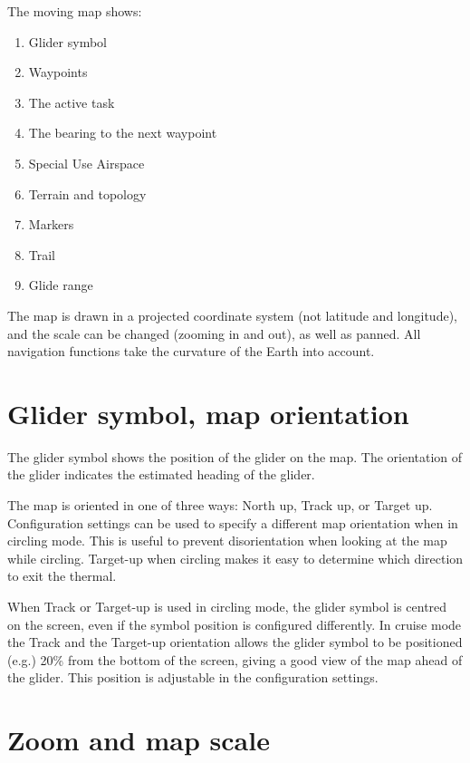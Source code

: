\documentclass[a4paper,12pt]{refrep}
\begin{document}
The moving map shows:
\begin{enumerate} 
\item Glider symbol
\item Waypoints
\item The active task
\item The bearing to the next waypoint
\item Special Use Airspace
\item Terrain and topology
\item Markers
\item Trail
\item Glide range
\end{enumerate}
The map is drawn in a projected coordinate system (not latitude and
longitude), and the scale can be changed (zooming in and out), as well
as panned.  All navigation functions take the curvature of the Earth
into account.

\section{Glider symbol, map orientation}
The glider symbol shows the position of the glider on the map.  The
orientation of the glider indicates the estimated heading of the
glider.

The map is oriented in one of three ways: North up,
Track up, or Target up.  Configuration settings  can be used
to specify a different map orientation when in circling mode. This is useful to prevent
disorientation when looking at the map while circling.  Target-up when
circling makes it easy to determine which direction to exit the
thermal.

When Track or Target-up is used in circling mode, the glider symbol is
centred on the screen, even if the symbol position is configured differently.
In cruise mode the Track and the Target-up orientation allows the glider
symbol to be positioned (e.g.) 20\% from the bottom of the screen, giving a good view of the
map ahead of the glider.  This position is adjustable in the configuration
 settings.

\section{Zoom and map scale}
\end{document}
